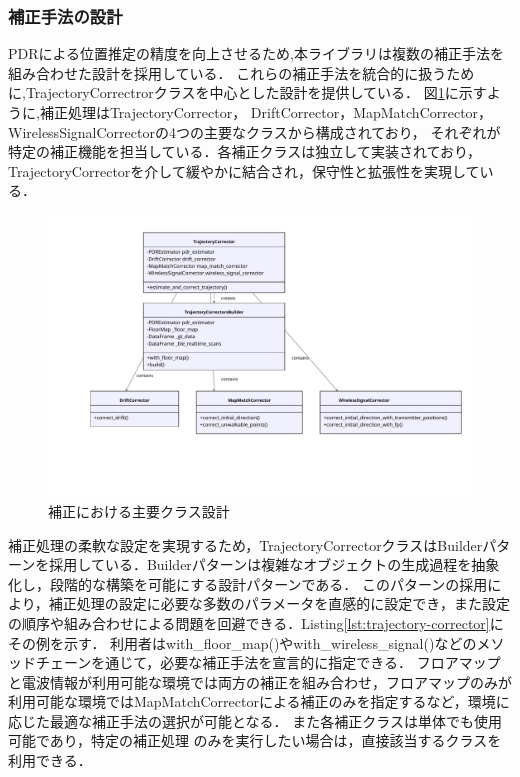 
\subsubsection{補正手法の設計}


PDRによる位置推定の精度を向上させるため,本ライブラリは複数の補正手法を
組み合わせた設計を採用している．
これらの補正手法を統合的に扱うために,TrajectoryCorrectrorクラスを中心とした設計を提供している．
図\ref{fig:corrector-class}に示すように,補正処理はTrajectoryCorrector，
DriftCorrector，MapMatchCorrector，WirelessSignalCorrectorの4つの主要なクラスから構成されており，
それぞれが特定の補正機能を担当している．各補正クラスは独立して実装されており，
TrajectoryCorrectorを介して緩やかに結合され，保守性と拡張性を実現している．

\begin{figure}[H]
    \centering
    \includegraphics[width=\linewidth]{../image/trajectory_corrector.pdf}
    \caption{補正における主要クラス設計}
    \label{fig:corrector-class}
\end{figure}

補正処理の柔軟な設定を実現するため，TrajectoryCorrectorクラスはBuilderパターンを採用している．Builderパターンは複雑なオブジェクトの生成過程を抽象化し，段階的な構築を可能にする設計パターンである．
このパターンの採用により，補正処理の設定に必要な多数のパラメータを直感的に設定でき，また設定の順序や組み合わせによる問題を回避できる．Listing\ref{lst:trajectory-corrector}にその例を示す．
利用者はwith\_floor\_map()やwith\_wireless\_signal()などのメソッドチェーンを通じて，必要な補正手法を宣言的に指定できる． フロアマップと電波情報が利用可能な環境では両方の補正を組み合わせ，フロアマップのみが利用可能な環境ではMapMatchCorrectorによる補正のみを指定するなど，環境に応じた最適な補正手法の選択が可能となる．
また各補正クラスは単体でも使用可能であり，特定の補正処理
のみを実行したい場合は，直接該当するクラスを利用できる．

